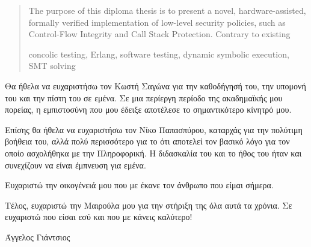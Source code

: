 \begin{abstract}
The purpose of this diploma thesis is to present a novel, hardware-assisted, formally verified implementation of low-level security policies, such as Control-Flow Integrity and Call Stack Protection. Contrary to existing 

\begin{keywordseng}
concolic testing, Erlang, software testing, dynamic symbolic execution, SMT solving
\end{keywordseng}

\end{abstract}


\begin{acknowledgements}
Θα ήθελα να ευχαριστήσω τον Κωστή Σαγώνα για την καθοδήγησή του, την υπομονή του και την πίστη του σε εμένα. 
Σε μια περίεργη περίοδο της ακαδημαϊκής μου πορείας, η εμπιστοσύνη που μου έδειξε αποτέλεσε το σημαντικότερο 
κίνητρό μου.

Επίσης θα ήθελα να ευχαριστήσω τον Νίκο Παπασπύρου, καταρχάς για την πολύτιμη βοήθεια του, αλλά πολύ περισσότερο
για το ότι αποτελεί τον βασικό λόγο για τον οποίο ασχολήθηκα με την Πληροφορική. Η διδασκαλία του και το ήθος 
του ήταν και συνεχίζουν να είναι έμπνευση για εμένα. 

Ευχαριστώ την οικογένειά μου που με έκανε τον άνθρωπο που είμαι σήμερα.

Τέλος, ευχαριστώ την Μαιρούλα μου για την στήριξη της όλα αυτά τα χρόνια. Σε ευχαριστώ που είσαι εσύ και που 
με κάνεις καλύτερο!
\begin{flushright}Άγγελος Γιάντσιος\end{flushright}

\end{acknowledgements}
